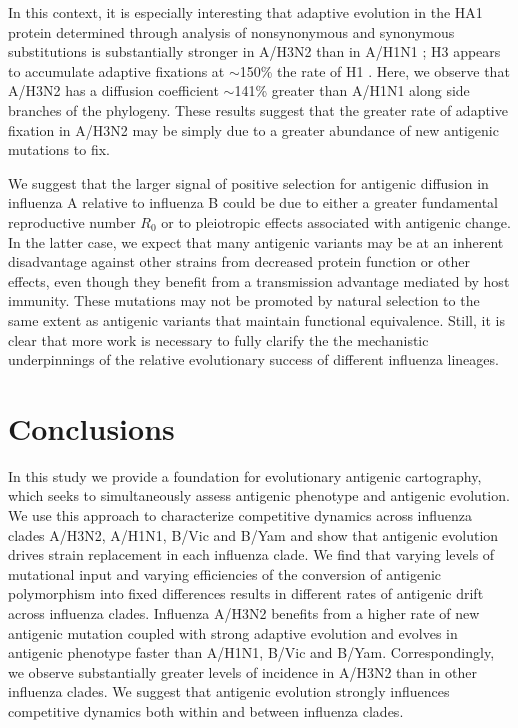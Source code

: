 \documentclass[11pt,oneside,letterpaper]{article}
\begin{document}
In this context, it is especially interesting that adaptive evolution in the HA1 protein determined through analysis of nonsynonymous and synonymous substitutions is substantially stronger in A/H3N2 than in A/H1N1 \cite{Wolf06}; H3 appears to accumulate adaptive fixations at $\sim$150\% the rate of H1 \cite{Bhatt11}.
Here, we observe that A/H3N2 has a diffusion coefficient $\sim$141\% greater than A/H1N1 along side branches of the phylogeny.
These results suggest that the greater rate of adaptive fixation in A/H3N2 may be simply due to a greater abundance of new antigenic mutations to fix.

We suggest that the larger signal of positive selection for antigenic diffusion in influenza A relative to influenza B could be due to either a greater fundamental reproductive number $R_0$ or to pleiotropic effects associated with antigenic change.
In the latter case, we expect that many antigenic variants may be at an inherent disadvantage against other strains from decreased protein function \cite{Kaverin04,Rudneva12} or other effects, even though they benefit from a transmission advantage mediated by host immunity.
These mutations may not be promoted by natural selection to the same extent as antigenic variants that maintain functional equivalence.
Still, it is clear that more work is necessary to fully clarify the the mechanistic underpinnings of the relative evolutionary success of different influenza lineages.

\section*{Conclusions}

In this study we provide a foundation for evolutionary antigenic cartography, which seeks to simultaneously assess antigenic phenotype and antigenic evolution.
We use this approach to characterize competitive dynamics across influenza clades A/H3N2, A/H1N1, B/Vic and B/Yam and show that antigenic evolution drives strain replacement in each influenza clade.
We find that varying levels of mutational input and varying efficiencies of the conversion of antigenic polymorphism into fixed differences results in different rates of antigenic drift across influenza clades.
Influenza A/H3N2 benefits from a higher rate of new antigenic mutation coupled with strong adaptive evolution and evolves in antigenic phenotype faster than A/H1N1, B/Vic and B/Yam.
Correspondingly, we observe substantially greater levels of incidence in A/H3N2 than in other influenza clades.
We suggest that antigenic evolution strongly influences competitive dynamics both within and between influenza clades.
\end{document}
